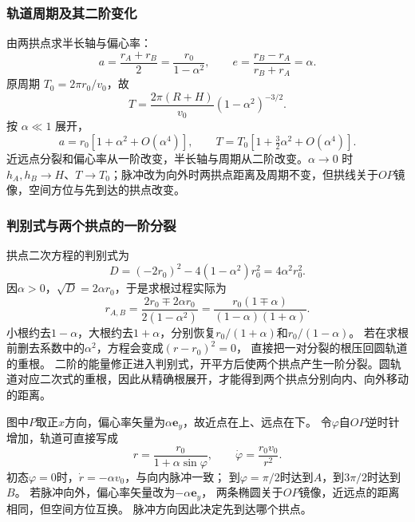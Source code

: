 \documentclass[UTF8,fontset=fandol,a4paper,11pt]{ctexart}
\newcommand{\vect}[1]{\bm{#1}}
\begin{document}
\subsubsection*{轨道周期及其二阶变化}
由两拱点求半长轴与偏心率：
\[
a=\frac{r_A+r_B}2=\frac{r_0}{1-\alpha^2},\qquad
e=\frac{r_B-r_A}{r_B+r_A}=\alpha.
\]
原周期 $T_0=2\pi r_0/v_0$，故
\[
\boxed{T=\frac{2\pi(R+H)}{v_0}(1-\alpha^2)^{-3/2}}.
\]
按 $\alpha\ll1$ 展开，
\[
a=r_0[1+\alpha^2+O(\alpha^4)],\qquad
T=T_0[1+\tfrac32\alpha^2+O(\alpha^4)].
\]
近远点分裂和偏心率从一阶改变，半长轴与周期从二阶改变。$\alpha\to0$ 时 $h_A,h_B\to H$、$T\to T_0$；脉冲改为向外时两拱点距离及周期不变，但拱线关于$OP$镜像，空间方位与先到达的拱点改变。
\subsubsection*{判别式与两个拱点的一阶分裂}
拱点二次方程的判别式为
\[
D=(-2r_0)^2-4(1-\alpha^2)r_0^2=4\alpha^2r_0^2.
\]
因$\alpha>0$，$\sqrt D=2\alpha r_0$，于是求根过程实际为
\[
r_{A,B}
=\frac{2r_0\mp2\alpha r_0}{2(1-\alpha^2)}
=\frac{r_0(1\mp\alpha)}{(1-\alpha)(1+\alpha)}.
\]
小根约去$1-\alpha$，大根约去$1+\alpha$，分别恢复$r_0/(1+\alpha)$和$r_0/(1-\alpha)$。
若在求根前删去系数中的$\alpha^2$，方程会变成$(r-r_0)^2=0$，
直接把一对分裂的根压回圆轨道的重根。
二阶的能量修正进入判别式，开平方后使两个拱点产生一阶分裂。圆轨道对应二次式的重根，因此从精确根展开，才能得到两个拱点分别向内、向外移动的距离。

图中$P$取正$x$方向，偏心率矢量为$\alpha\vect e_y$，故近点在上、远点在下。
令$\varphi$自$OP$逆时针增加，轨道可直接写成
\[
r=\frac{r_0}{1+\alpha\sin\varphi},\qquad
\dot\varphi=\frac{r_0v_0}{r^2}.
\]
初态$\varphi=0$时，$\dot r=-\alpha v_0$，与向内脉冲一致；
到$\varphi=\pi/2$时达到$A$，到$3\pi/2$时达到$B$。
若脉冲向外，偏心率矢量改为$-\alpha\vect e_y$，
两条椭圆关于$OP$镜像，近远点的距离相同，但空间方位互换。
脉冲方向因此决定先到达哪个拱点。
\end{document}
